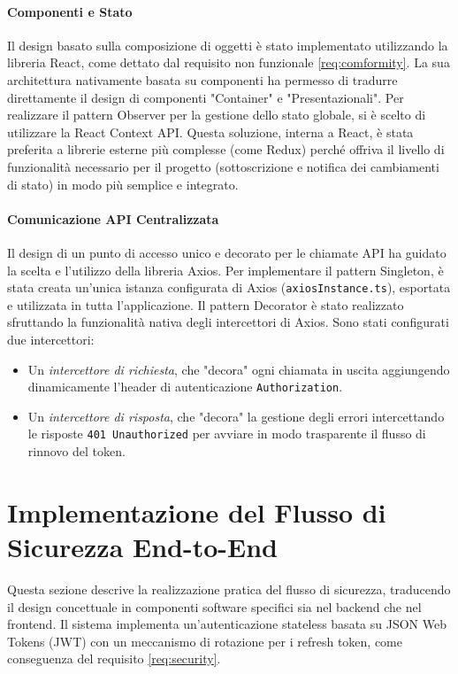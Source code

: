 \documentclass[12pt,a4paper,openright,twoside]{book}
\begin{document}
\paragraph{Componenti e Stato}
Il design basato sulla composizione di oggetti è stato implementato utilizzando la libreria React, come dettato dal requisito non funzionale \ref{req:comformity}. La sua architettura nativamente basata su componenti ha permesso di tradurre direttamente il design di componenti "Container" e "Presentazionali". Per realizzare il pattern Observer per la gestione dello stato globale, si è scelto di utilizzare la React Context API. Questa soluzione, interna a React, è stata preferita a librerie esterne più complesse (come Redux) perché offriva il livello di funzionalità necessario per il progetto (sottoscrizione e notifica dei cambiamenti di stato) in modo più semplice e integrato.

\paragraph{Comunicazione API Centralizzata}
Il design di un punto di accesso unico e decorato per le chiamate API ha guidato la scelta e l'utilizzo della libreria Axios. Per implementare il pattern Singleton, è stata creata un'unica istanza configurata di Axios (\texttt{axiosInstance.ts}), esportata e utilizzata in tutta l'applicazione. Il pattern Decorator è stato realizzato sfruttando la funzionalità nativa degli intercettori di Axios. Sono stati configurati due intercettori:
\begin{itemize}
    \item Un \textit{intercettore di richiesta}, che "decora" ogni chiamata in uscita aggiungendo dinamicamente l'header di autenticazione \texttt{Authorization}.
    \item Un \textit{intercettore di risposta}, che "decora" la gestione degli errori intercettando le risposte \texttt{401 Unauthorized} per avviare in modo trasparente il flusso di rinnovo del token.
\end{itemize}

\section{Implementazione del Flusso di Sicurezza End-to-End}
\label{sec:impl_security}

Questa sezione descrive la realizzazione pratica del flusso di sicurezza, traducendo il design concettuale in componenti software specifici sia nel backend che nel frontend. Il sistema implementa un'autenticazione stateless basata su JSON Web Tokens (JWT) con un meccanismo di rotazione per i refresh token, come conseguenza del requisito \ref{req:security}.
\end{document}

